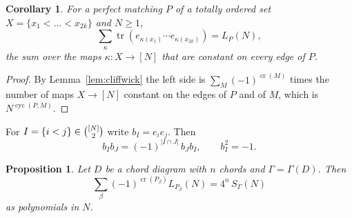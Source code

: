 \documentclass[11pt,a4paper,reqno]{amsart}
\newtheorem{proposition}[theorem]{Proposition}
\newtheorem{corollary}[theorem]{Corollary}
\theoremstyle{definition}
\newcommand{\tr}{\operatorname{tr}}
\newcommand{\cro}{\operatorname{cr}}
\newcommand{\cyc}{\operatorname{cyc}}
\newcommand{\binomset}[2]{\tbinom{#1}{#2}}
\begin{document}
\begin{corollary}\label{cor:colour}
For a perfect matching $P$ of a totally ordered set $X=\{x_1<\dots<x_{2k}\}$ and $N\ge1$,
\[
\sum_\kappa\tr(e_{\kappa(x_1)}\cdots e_{\kappa(x_{2k})})=L_P(N),
\]
the sum over the maps $\kappa\colon X\to[N]$ that are constant on every edge of $P$.
\end{corollary}

\begin{proof}
By Lemma~\ref{lem:cliffwick} the left side is $\sum_M(-1)^{\cro(M)}$ times the number of maps $X\to[N]$ constant on the edges of $P$ and of $M$, which is $N^{\cyc(P,M)}$.
\end{proof}

For $I=\{i<j\}\in\binomset{[N]}{2}$ write $b_I=e_ie_j$. Then
\begin{equation}\label{eq:bivector}
b_Ib_J=(-1)^{|I\cap J|}\,b_Jb_I,\qquad b_I^2=-1 .
\end{equation}

\begin{proposition}\label{prop:clifford}
Let $D$ be a chord diagram with $n$ chords and $\Gamma=\Gamma(D)$. Then
\[
\sum_\beta(-1)^{\cro(P_\beta)}L_{P_\beta}(N)=4^n\,S_\Gamma(N)
\]
as polynomials in $N$.
\end{proposition}
\end{document}
